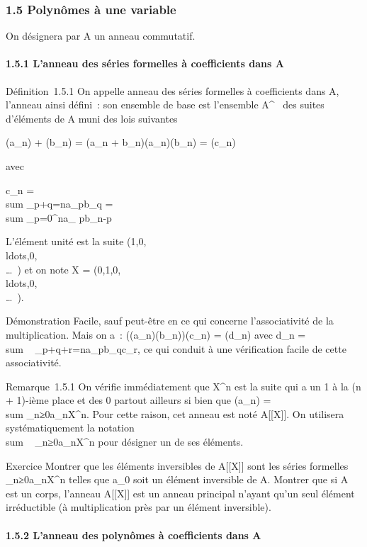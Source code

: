 
\subsubsection{1.5 Polynômes à une variable}

On désignera par A un anneau commutatif.

\paragraph{1.5.1 L'anneau des séries formelles à coefficients dans A}

Définition~1.5.1 On appelle anneau des séries formelles à coefficients
dans A, l'anneau ainsi défini~: son ensemble de base est l'ensemble
A^~ des suites d'éléments de A muni des lois suivantes

(a_n) + (b_n) = (a_n +
b_n)\quad (a_n)(b_n) =
(c_n)

avec

c_n = \\sum
_p+q=na_pb_q = \\sum
_p=0^na_ pb_n-p

L'élément unité est la suite
(1,0,\\ldots,0,\\\ldots~)
et on note X =
(0,1,0,\\ldots,0,\\\ldots~).

Démonstration Facile, sauf peut-être en ce qui concerne l'associativité
de la multiplication. Mais on a~:
((a_n)(b_n))(c_n) = (d_n) avec
d_n = \\sum ~
_p+q+r=na_pb_qc_r, ce qui conduit à
une vérification facile de cette associativité.

Remarque~1.5.1 On vérifie immédiatement que X^n est la suite
qui a un 1 à la (n + 1)-ième place et des 0 partout ailleurs si bien que
(a_n) =\ \\sum
 _n≥0a_nX^n. Pour cette raison, cet
anneau est noté A[[X]]. On utilisera systématiquement la
notation \\sum ~
_n≥0a_nX^n pour désigner un de ses éléments.

Exercice Montrer que les éléments inversibles de A[[X]] sont les
séries formelles \\\sum
 _n≥0a_nX^n telles que a_0 soit
un élément inversible de A. Montrer que si A est un corps, l'anneau
A[[X]] est un anneau principal n'ayant qu'un seul élément
irréductible (à multiplication près par un élément inversible).

\paragraph{1.5.2 L'anneau des polynômes à coefficients dans A}

